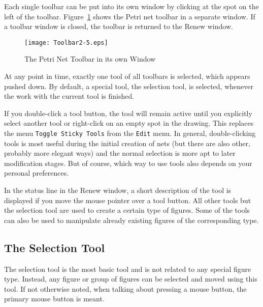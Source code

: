 Each single toolbar can be put into its own window by clicking
at the spot on the left of the toolbar. 
Figure~\ref{fig:toolbarWindow} shows the Petri net toolbar in a
separate window.
If a toolbar window is closed, the toolbar is returned to the Renew
window.

\begin{figure}[htbp]
  \centerline{%
    \texttt{[image: Toolbar2-5.eps]}%
    }
  \caption{\label{fig:toolbarWindow}The Petri Net Toolbar in its own Window}
\end{figure}%

At any point in time, exactly one tool of all toolbars is selected,
which appears pushed down.
By default, a special tool, the selection tool, is selected,
whenever the work with the current tool is finished.

If you double-click a tool button, the tool will remain active until
you explicitly select another tool or right-click on an empty spot in
the drawing.
This replaces the menu \texttt{Toggle Sticky Tools} from the
\texttt{Edit} menu.
In general, double-clicking tools is most useful during the
initial creation of nets (but there are also other, probably more
elegant ways) and the normal selection is more apt to
later modification stages.
But of course, which way to use tools also depends on your
personal preferences.

In the status line in the Renew window, a short description of the tool
is displayed if you move the mouse pointer over a tool button.
All other tools but the selection tool are used to create a certain type
of figures. Some of the tools can also be used to manipulate already existing
figures of the corresponding type.

\subsection{The Selection Tool}
\label{subsec:toolSelection}

The selection tool is the most basic tool and is not related to any special
figure type.
Instead, any figure or group of figures can be selected and moved using this
tool.
If not otherwise noted, when talking about pressing a mouse button,
the primary mouse button is meant.

